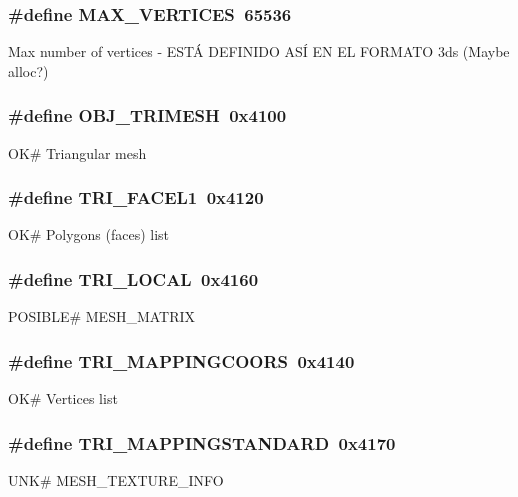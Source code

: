 \subsubsection[{MAX\_\-VERTICES}]{\setlength{\rightskip}{0pt plus 5cm}\#define MAX\_\-VERTICES~65536}\label{objetos_8h_a0fdb7b933ef091574ff57d1f36dd4167}
Max number of vertices -\/ ESTÁ DEFINIDO ASÍ EN EL FORMATO 3ds (Maybe alloc?) 
\subsubsection[{OBJ\_\-TRIMESH}]{\setlength{\rightskip}{0pt plus 5cm}\#define OBJ\_\-TRIMESH~0x4100}\label{objetos_8h_a4925d3d641bec11ca0c49ba3d636393c}
OK\# Triangular mesh 
\subsubsection[{TRI\_\-FACEL1}]{\setlength{\rightskip}{0pt plus 5cm}\#define TRI\_\-FACEL1~0x4120}\label{objetos_8h_a13512db294c63f8477e47aeefcc7697a}
OK\# Polygons (faces) list 
\subsubsection[{TRI\_\-LOCAL}]{\setlength{\rightskip}{0pt plus 5cm}\#define TRI\_\-LOCAL~0x4160}\label{objetos_8h_a269b0df4388c015cae6ba837d499dfd5}
POSIBLE\# MESH\_\-MATRIX 
\subsubsection[{TRI\_\-MAPPINGCOORS}]{\setlength{\rightskip}{0pt plus 5cm}\#define TRI\_\-MAPPINGCOORS~0x4140}\label{objetos_8h_a6d9396a66d6d3690152ebff37cab8e2a}
OK\# Vertices list 
\subsubsection[{TRI\_\-MAPPINGSTANDARD}]{\setlength{\rightskip}{0pt plus 5cm}\#define TRI\_\-MAPPINGSTANDARD~0x4170}\label{objetos_8h_ae245ca6e00ec7bea4d75d9f9d27d44cb}
UNK\# MESH\_\-TEXTURE\_\-INFO 
